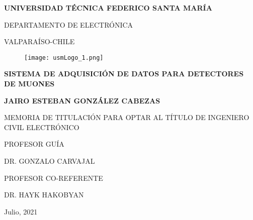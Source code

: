 

\pagestyle{empty}


\begin{center}

\large \textbf{UNIVERSIDAD TÉCNICA FEDERICO SANTA MARÍA}

\vspace{3mm}

\normalsize DEPARTAMENTO DE ELECTRÓNICA

\vspace{3mm}

\normalsize VALPARAÍSO-CHILE

\vspace{4mm}
		\begin{figure}[H]
			\centering
			\texttt{[image: usmLogo\_1.png]}
		\end{figure}
\vspace{2mm}

\Large{\bf SISTEMA DE ADQUISICIÓN DE DATOS PARA DETECTORES DE MUONES}

\vspace{10mm}



\large \textbf{JAIRO ESTEBAN GONZÁLEZ CABEZAS}

\vspace{10mm}

\normalsize
MEMORIA DE TITULACIÓN PARA OPTAR AL TÍTULO DE INGENIERO CIVIL ELECTRÓNICO

\vspace{5mm}

PROFESOR GUÍA


DR. GONZALO CARVAJAL
\vspace{5mm}

PROFESOR CO-REFERENTE


DR. HAYK HAKOBYAN

\vspace{10mm}

Julio, 2021


\end{center}



\cleardoublepage

\vspace{50mm}

\begin{flushright}
  {\emph{\\}}
 \vspace{3mm}
  {\emph{\\}}


 
\end{flushright}
\vspace{170mm}
\begin{flushright}
{\emph{\\}}
\end{flushright}
